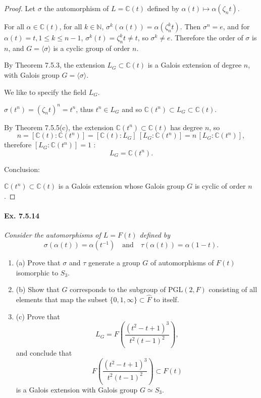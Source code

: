\documentclass[11pt,a4paper]{article}
\newcommand{\be} {\begin{enumerate}}
\newcommand{\ee} {\end{enumerate}}
\newcommand{\N}{\mathbb{N}}
\newcommand{\C}{\mathbb{C}}
\begin{document}
\begin{proof}
Let $\sigma$ the automorphism of $L = \C(t)$ defined by $\alpha(t) \mapsto \alpha(\zeta_n t)$.

For all $\alpha \in \C(t)$, for all $k \in \N$, $\sigma^k(\alpha(t)) =\alpha( \zeta_n^k t)$. Then $\sigma^n = e$, and for $\alpha(t) = t, 1\leq k \leq n-1$, $\sigma^k(t) = \zeta_n^k t \ne t$, so $\sigma^k \ne e$. Therefore the order of $\sigma$ is $n$, and $G = \langle \sigma \rangle$ is a cyclic group of order $n$.

By Theorem 7.5.3, the extension $L_G \subset \C(t)$ is a Galois extension of degree $n$, with Galois group $G = \langle \sigma \rangle$.

We like to specify the field $L_G$.

$\sigma(t^n) = (\zeta_nt)^n=t^n$, thus $t^n\in L_G$ and so $\C(t^n) \subset L_G \subset \C(t)$.

By Theorem 7.5.5(c), the extension $\C(t^n) \subset \C(t)$ has degree $n$, so
$$n = [\C(t):\C(t^n)] = [\C(t):L_G]\ [L_G:\C(t^n)] = n\, [L_G:\C(t^n)],$$
therefore $[L_G:\C(t^n)]=1$ : 
$$L_G = \C(t^n).$$

Conclusion:

$\C(t^n)\subset \C(t)$ is a Galois extension whose Galois group $G$ is cyclic of order $n$.
\end{proof}

\paragraph{Ex. 7.5.14}

{\it Consider the automorphisms of $L = F(t)$ defined by
$$\sigma\left(\alpha(t)\right) =\alpha(t^{-1})\quad \mathrm{and}\quad \tau\left(\alpha(t)\right) = \alpha(1-t).$$
\be
\item[(a)] Prove that $\sigma$ and $\tau$ generate a group $G$ of automorphisms of $F(t)$ isomorphic to $S_3$.
\item[(b)] Show that $G$ corresponds to the subgroup of $\mathrm{PGL}(2,F)$ consisting of all elements that map the subset $\{0,1,\infty\} \subset \hat{F}$ to itself.
\item[(c)] Prove that
$$L_G = F\left( \frac{(t^2-t+1)^3}{t^2(t-1)^2}\right),$$
and conclude that
$$F\left( \frac{(t^2-t+1)^3}{t^2(t-1)^2}\right) \subset F(t)$$
is a Galois extension with Galois group $G \simeq S_3$.
\ee
}
\end{document}
